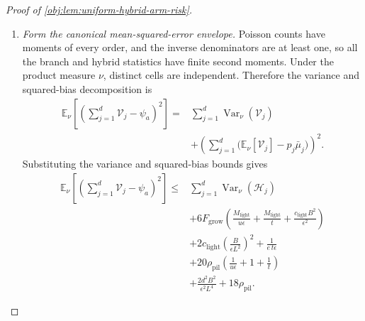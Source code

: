 \documentclass[11pt]{article}
\begin{document}
\begin{proof}[Proof of \cref{obj:lem:uniform-hybrid-arm-risk}]
\begin{enumerate}
\item \textit{Form the canonical mean-squared-error envelope.}
Poisson counts have moments of every order, and the inverse denominators are at least one, so all the branch and hybrid statistics have finite second moments. Under the product measure \(\nu\), distinct cells are independent. Therefore the variance and squared-bias decomposition is
\[
\begin{aligned}
\mathbb E_\nu\left[
\left(\sum_{j=1}^d\mathcal V_j-\psi_a\right)^2
\right]
={}&
\sum_{j=1}^d\operatorname{Var}_\nu(\mathcal V_j)\\
&+
\left(
\sum_{j=1}^d
\bigl(\mathbb E_\nu[\mathcal V_j]-p_j\bar\mu_j\bigr)
\right)^2.
\end{aligned}
\]
Substituting the variance and squared-bias bounds gives
\[
\begin{aligned}
\mathbb E_\nu\left[
\left(\sum_{j=1}^d\mathcal V_j-\psi_a\right)^2
\right]
\le{}&
\sum_{j=1}^d\operatorname{Var}_\nu(\mathcal H_j)\\
&+6F_{\mathrm{grow}}
\left(
\frac{M_{\mathrm{light}}}{u\epsilon}
+\frac{M_{\mathrm{light}}}{t}
+\frac{c_{\mathrm{light}}B^2}{\epsilon^2}
\right)\\
&+2c_{\mathrm{light}}
\left(\frac B{\epsilon L^2}\right)^2
+\frac1{e\,t\epsilon}\\
&+20\rho_{\mathrm{pil}}
\left(\frac1{u\epsilon}+1+\frac1t\right)\\
&+\frac{2d^2B^2}{\epsilon^2L^4}
+18\rho_{\mathrm{pil}}.
\end{aligned}
\]


\end{enumerate}
\end{proof}
\end{document}
